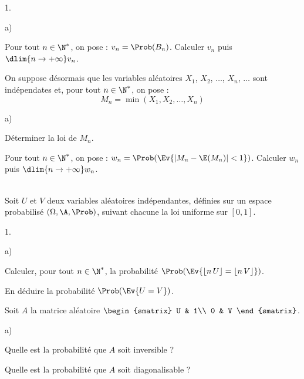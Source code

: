\begin{exerciceAP}
\begin{noliste}{1.}
\begin{noliste}{a)}
      \item Pour tout $n\in \N^*$, on pose : $v_n = \Prob(B_n)$.
      Calculer $v_n$ puis $\dlim{n\to +\infty} v_n$.
    \end{noliste}
    
    \item On suppose désormais que les variables aléatoires $X_1$, 
    $X_2$, $\ldots$, $X_n$, $\ldots$ sont indépendates et, pour 
    tout $n\in\N^*$, on pose :
    \[
      M_n = \min(X_1, X_2, \ldots, X_n)
    \]
    \begin{noliste}{a)}
    \setlength{\itemsep}{2mm}
      \item Déterminer la loi de $M_n$.
      
      \item Pour tout $n\in\N^*$, on pose : $w_n = \Prob(\Ev{\vert 
      M_n - \E(M_n) \vert <1})$. Calculer $w_n$ puis $\dlim{n\to 
      +\infty} w_n$.
    \end{noliste}
  \end{noliste}
\end{exerciceAP} 



\begin{exerciceSP}~\\
  Soit $U$ et $V$ deux variables aléatoires indépendantes, définies 
  sur un espace probabilisé $(\Omega, \A, \Prob)$, suivant chacune 
  la loi uniforme sur $[0,1]$.
  \begin{noliste}{1.}
    \setlength{\itemsep}{2mm}
    \item 
    \begin{noliste}{a)}
    \setlength{\itemsep}{2mm}
      \item Calculer, pour tout $n\in \N^*$, la probabilité 
      $\Prob(\Ev{\lfloor n \, U \rfloor = \lfloor n \, V \rfloor})$.
      
      \item En déduire la probabilité $\Prob(\Ev{U=V})$.
    \end{noliste}
    
    \item Soit $A$ la matrice aléatoire $
    \begin{smatrix}
      U & 1\\
      0 & V
    \end{smatrix}$.
    \begin{noliste}{a)}
    \setlength{\itemsep}{2mm}
      \item Quelle est la probabilité que $A$ soit inversible ?
      
      \item Quelle est la probabilité que $A$ soit diagonalisable ?
    \end{noliste}
  \end{noliste}
\end{exerciceSP} 


